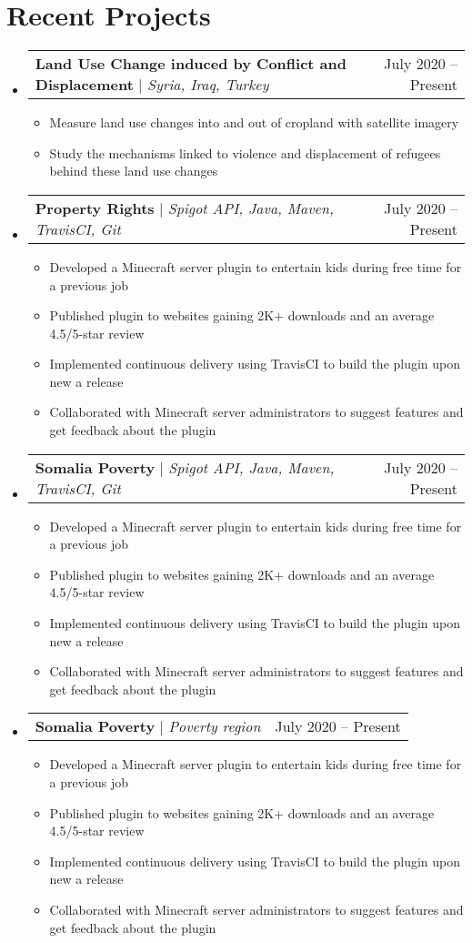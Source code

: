\documentclass[letterpaper,11pt]{article}
\makeatletter
\newcommand{\resumeItem}[1]{
  \item\small{
    {#1 \vspace{-2pt}}
  }
}
\newcommand{\resumeProjectHeading}[2]{
    \item
    \begin{tabular*}{0.97\textwidth}{l@{\extracolsep{\fill}}r}
      \small#1 & #2 \\
    \end{tabular*}\vspace{-7pt}
}
\newcommand{\resumeSubHeadingListStart}{\begin{itemize}[leftmargin=0.15in, label={}]}
\newcommand{\resumeSubHeadingListEnd}{\end{itemize}}
\newcommand{\resumeItemListStart}{\begin{itemize}}
\newcommand{\resumeItemListEnd}{\end{itemize}\vspace{-5pt}}
\makeatother
\begin{document}
\section{Recent Projects}
    \resumeSubHeadingListStart
      \resumeProjectHeading
          {\textbf{Land Use Change induced by Conflict and Displacement} $|$ \emph{Syria, Iraq, Turkey}}{July 2020 -- Present}
          \resumeItemListStart
            \resumeItem{Measure land use changes into and out of cropland with satellite imagery}
            \resumeItem{Study the mechanisms linked to violence and displacement of refugees behind these land use changes}
          \resumeItemListEnd
      \resumeProjectHeading
          {\textbf{Property Rights} $|$ \emph{Spigot API, Java, Maven, TravisCI, Git}}{July 2020 -- Present}
          \resumeItemListStart
            \resumeItem{Developed a Minecraft server plugin to entertain kids during free time for a previous job}
            \resumeItem{Published plugin to websites gaining 2K+ downloads and an average 4.5/5-star review}
            \resumeItem{Implemented continuous delivery using TravisCI to build the plugin upon new a release}
            \resumeItem{Collaborated with Minecraft server administrators to suggest features and get feedback about the plugin}
          \resumeItemListEnd     
         \resumeProjectHeading
          {\textbf{Somalia Poverty} $|$ \emph{Spigot API, Java, Maven, TravisCI, Git}}{July 2020 -- Present}
          \resumeItemListStart
            \resumeItem{Developed a Minecraft server plugin to entertain kids during free time for a previous job}
            \resumeItem{Published plugin to websites gaining 2K+ downloads and an average 4.5/5-star review}
            \resumeItem{Implemented continuous delivery using TravisCI to build the plugin upon new a release}
            \resumeItem{Collaborated with Minecraft server administrators to suggest features and get feedback about the plugin}
          \resumeItemListEnd
                  \resumeProjectHeading 
         {\textbf{Somalia Poverty} $|$ \emph{Poverty region}}{July 2020 -- Present}
          \resumeItemListStart
            \resumeItem{Developed a Minecraft server plugin to entertain kids during free time for a previous job}
            \resumeItem{Published plugin to websites gaining 2K+ downloads and an average 4.5/5-star review}
            \resumeItem{Implemented continuous delivery using TravisCI to build the plugin upon new a release}
            \resumeItem{Collaborated with Minecraft server administrators to suggest features and get feedback about the plugin}
          \resumeItemListEnd
    \resumeSubHeadingListEnd
\end{document}
